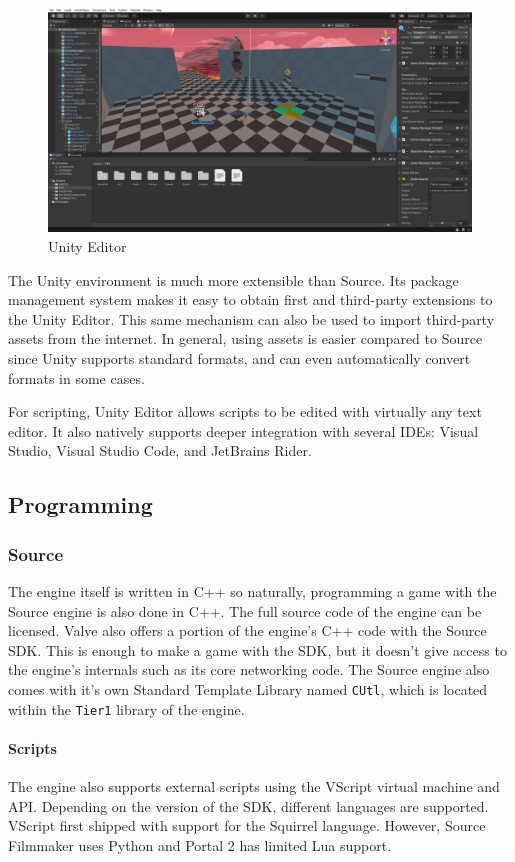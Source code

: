 \documentclass[a4paper, 12pt]{scrartcl}
\begin{document}
\begin{figure}[!ht]
  \centering
  \includegraphics[width=\linewidth]{images/unity_editor.png}
  \caption{Unity Editor}
\end{figure}

The Unity environment is much more extensible than Source. Its package management system makes it easy to obtain first and third-party extensions to the Unity Editor. This same mechanism can also be used to import third-party assets from the internet. In general, using assets is easier compared to Source since Unity supports standard formats, and can even automatically convert formats in some cases.

For scripting, Unity Editor allows scripts to be edited with virtually any text editor. It also natively supports deeper integration with several IDEs: Visual Studio, Visual Studio Code, and JetBrains Rider.

\subsection{Programming}
\subsubsection{Source}
The engine itself is written in C++ so naturally, programming a game with the Source engine is also done in C++. The full source code of the engine can be licensed. Valve also offers a portion of the engine's C++ code with the Source SDK. This is enough to make a game with the SDK, but it doesn't give access to the engine's internals such as its core networking code. The Source engine also comes with it's own Standard Template Library named \texttt{CUtl}, which is located within the \texttt{Tier1} library of the engine.

\paragraph{Scripts}
The engine also supports external scripts using the VScript virtual machine and API. Depending on the version of the SDK, different languages are supported. VScript first shipped with support for the Squirrel language. However, Source Filmmaker uses Python and Portal 2 has limited Lua support.
\end{document}
